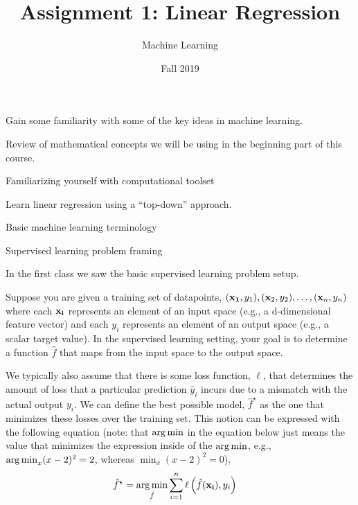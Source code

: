 \documentclass[assignment01_Solutions]{subfiles}
\title{Assignment 1: Linear Regression}
\author{Machine Learning}
\date{Fall 2019}
\begin{document}
\maketitle
\thispagestyle{firstpage}


\begin{learningobjectives}
\bi
\item Gain some familiarity with some of the key ideas in machine learning.
\item Review of mathematical concepts we will be using in the beginning part of this course.
\item Familiarizing yourself with computational toolset
\item Learn linear regression using a ``top-down'' approach.
\ei
\end{learningobjectives}


\begin{priorknowledge}
\bi
\item Basic machine learning terminology
\item Supervised learning problem framing
\ei
\end{priorknowledge}


\begin{recall}
In the first class we saw the basic supervised learning problem setup.

Suppose you are given a training set of datapoints, $(\mathbf{x_1}, y_1), (\mathbf{x}_2, y_2), \ldots, (\mathbf{x}_n, y_n)$ where each $\mathbf{x_i}$ represents an element of an input space (e.g., a d-dimensional feature vector) and each $y_i$ represents an element of an output space (e.g., a scalar target value).  In the supervised learning setting, your goal is to determine a function $\hat{f}$ that maps from the input space to the output space.

We typically also assume that there is some loss function, $\ell$, that determines the amount of loss that a particular prediction $\hat{y}_i$ incurs due to a mismatch with the actual output $y_i$.  We can define the best possible model, $\hat{f}^\star$ as the one that minimizes these losses over the training set.  This notion can be expressed with the following equation  (note: that $\operatorname*{arg\,min}$ in the equation below just means the value that minimizes the expression inside of the $\operatorname*{arg\,min}$, e.g., $\operatorname*{arg\,min}_{x} (x - 2)^2 = 2$, whereas $\min_{x} (x-2)^2 = 0$).
\begin{align}
\hat{f}^\star &= \operatorname*{arg\,min}_{\hat{f}} \sum_{i=1}^n \ell \left ( \hat{f}(\mathbf{x_i}), y_i \right )
\end{align} 

\end{recall}
\end{document}
